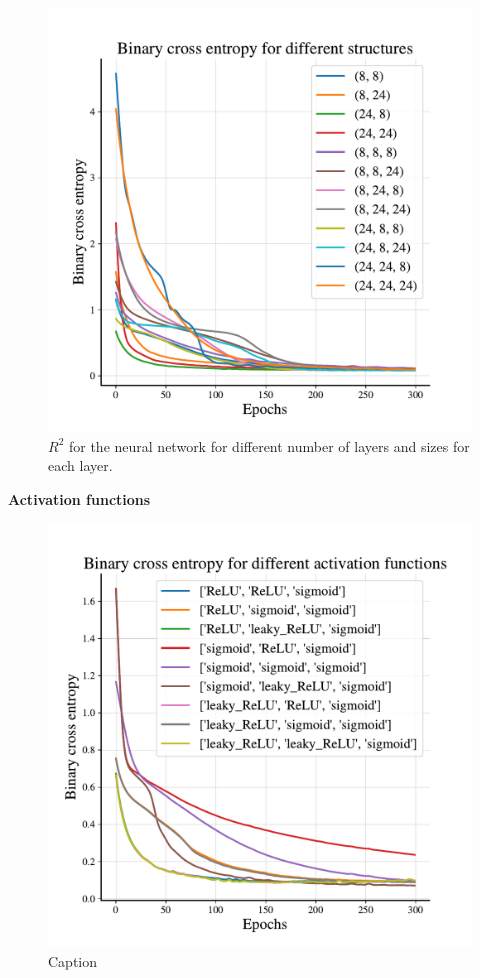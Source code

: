 \begin{figure}
    \centering
    \includegraphics[width=1.0\linewidth]{project_2/figures/Binary cross entropy for different structures_classification.pdf}
    \caption{$R^2$ for the neural network for different number of layers and sizes for each layer.}
    \label{fig:structure_cancer}
\end{figure}

\textbf{Activation functions}

\begin{figure}
    \centering
    \includegraphics[width=1.0\linewidth]{project_2/figures/Binary cross entropy for different activation functions_classification.pdf}
    \caption{Caption}
    \label{fig:activations_cancer}
\end{figure}

